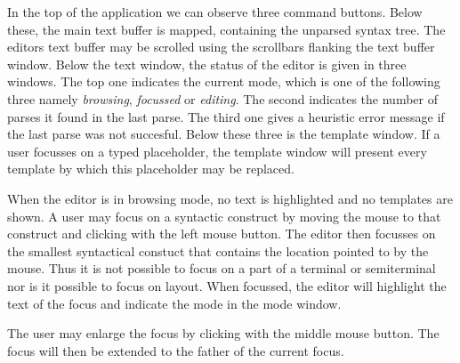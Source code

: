 In the top of the application we can observe three command buttons.
Below these, the main text buffer is mapped, containing the unparsed
syntax tree. The editors text buffer may be scrolled using the
scrollbars flanking the text buffer window.  Below the text window,
the status of the editor is given in three windows. The top one
indicates the current mode, which is one of the following three
namely {\em browsing}, {\em focussed} or {\em editing}. The second
indicates the number of parses it found in the last parse. The third
one gives a heuristic error message if the last parse was not succesful.
Below these three is the template window. If a user focusses on
a typed placeholder, the template window will present every template
by which this placeholder may be replaced.

When the editor is in browsing mode, no text is highlighted and no
templates are shown. A user may focus on a syntactic construct by
moving the mouse to that construct and clicking with the left mouse
button. The editor then focusses on the smallest syntactical
constuct that contains the location pointed to by the mouse.
Thus it is not possible to focus on a part of a terminal or semiterminal
nor is it possible to focus on layout. When focussed, the editor will
highlight the text of the focus and indicate the mode in the mode window.

The user may enlarge the focus by clicking with the middle
mouse button. The focus will then be extended to the father
of the current focus.

